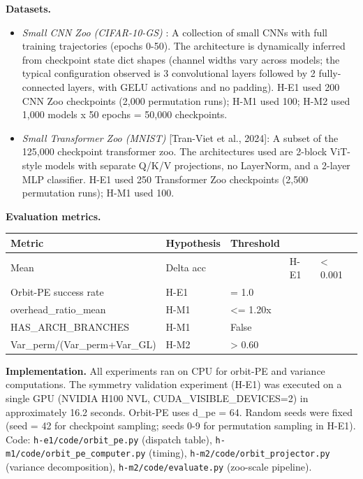 
\textbf{Datasets.}

\begin{itemize}
\item \textit{Small CNN Zoo (CIFAR-10-GS)} \citep{Unterthineretal2020}: A collection of small CNNs with full training trajectories (epochs 0-50). The architecture is dynamically inferred from checkpoint state dict shapes (channel widths vary across models; the typical configuration observed is 3 convolutional layers followed by 2 fully-connected layers, with GELU activations and no padding). H-E1 used 200 CNN Zoo checkpoints (2,000 permutation runs); H-M1 used 100; H-M2 used 1,000 models x 50 epochs = 50,000 checkpoints.
\end{itemize}

\begin{itemize}
\item \textit{Small Transformer Zoo (MNIST)} [Tran-Viet et al., 2024]: A subset of the 125,000 checkpoint transformer zoo. The architectures used are 2-block ViT-style models with separate Q/K/V projections, no LayerNorm, and a 2-layer MLP classifier. H-E1 used 250 Transformer Zoo checkpoints (2,500 permutation runs); H-M1 used 100.
\end{itemize}

\textbf{Evaluation metrics.}

\begin{table}[htbp]
\centering
\begin{tabular}{lllll}
\toprule
Metric & Hypothesis & Threshold &  &  \\
\midrule
Mean & Delta acc &  & H-E1 & < 0.001 \\
Orbit-PE success rate & H-E1 & = 1.0 &  &  \\
overhead_ratio_mean & H-M1 & <= 1.20x &  &  \\
HAS_ARCH_BRANCHES & H-M1 & False &  &  \\
Var_perm/(Var_perm+Var_GL) & H-M2 & > 0.60 &  &  \\
\bottomrule
\end{tabular}
\end{table}

\textbf{Implementation.} All experiments ran on CPU for orbit-PE and variance computations. The symmetry validation experiment (H-E1) was executed on a single GPU (NVIDIA H100 NVL, CUDA_VISIBLE_DEVICES=2) in approximately 16.2 seconds. Orbit-PE uses d_pe = 64. Random seeds were fixed (seed = 42 for checkpoint sampling; seeds 0-9 for permutation sampling in H-E1). Code: \texttt{h-e1/code/orbit_pe.py} (dispatch table), \texttt{h-m1/code/orbit_pe_computer.py} (timing), \texttt{h-m2/code/orbit_projector.py} (variance decomposition), \texttt{h-m2/code/evaluate.py} (zoo-scale pipeline).


